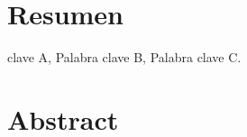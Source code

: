 \thispagestyle{plain}
\chapter*{Resumen}

\lipsum[1-1]


\keywordspt clave A, Palabra clave B, Palabra clave C.


\chapter*{Abstract}

\lipsum[1-1]



